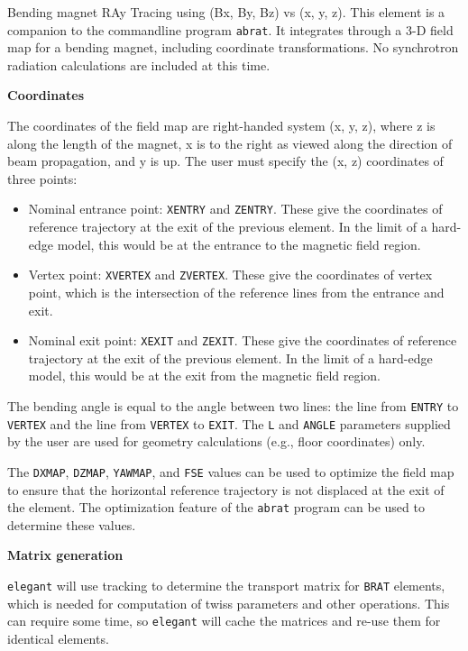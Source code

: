 Bending magnet RAy Tracing using (Bx, By, Bz) vs (x, y, z).
This element is a companion to the commandline program {\tt abrat}.
It integrates through a 3-D field map for a bending magnet, including
coordinate transformations.
No synchrotron radiation calculations are included at this time.

{\bf Coordinates}

The coordinates of the field map are right-handed system (x, y, z), where z is along the length of the magnet, x is 
to the right as viewed along the direction of beam propagation, and y is up.
The user must specify the (x, z) coordinates of three points:
\begin{itemize}
\item Nominal entrance point: \verb|XENTRY| and \verb|ZENTRY|. These give the coordinates of reference trajectory at
  the exit of the previous element. In the limit of a hard-edge model, this would be at the entrance to the magnetic field 
  region.
\item Vertex point: \verb|XVERTEX| and \verb|ZVERTEX|. These give the coordinates of vertex point, which is the intersection
  of the reference lines from the entrance and exit.
\item Nominal exit point: \verb|XEXIT| and \verb|ZEXIT|. These give the coordinates of reference trajectory at
  the exit of the previous element. In the limit of a hard-edge model, this would be at the exit from the magnetic field 
  region.
\end{itemize}
The bending angle is equal to the angle between two lines: the line from \verb|ENTRY| to \verb|VERTEX| and the
line from \verb|VERTEX| to \verb|EXIT|.
The \verb|L| and \verb|ANGLE| parameters supplied by the user are used for geometry calculations (e.g., floor coordinates) only.

The \verb|DXMAP|, \verb|DZMAP|, \verb|YAWMAP|, and \verb|FSE| values can be used to optimize the field map to ensure that
the horizontal reference trajectory is not displaced at the exit of the element.
The optimization feature of the \verb|abrat| program can be used to determine these values.

{\bf Matrix generation}

{\tt elegant} will use tracking to determine the transport matrix for \verb|BRAT| elements, which 
is needed for computation of twiss parameters and other operations.
This can require some time, so {\tt elegant} will cache the matrices and re-use them for
identical elements.

